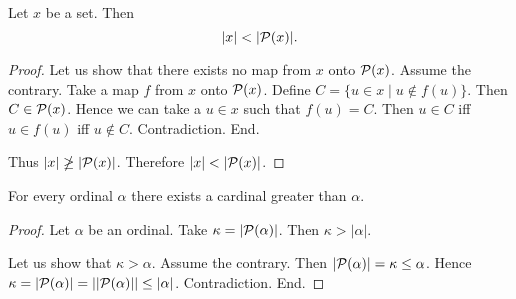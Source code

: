 \documentclass[../set-theory.tex]{subfiles}
\begin{document}
  \begin{forthel}
    \begin{theorem}[Cantor]
      Let $x$ be a set.
      Then \[ |x| < |\mathcal{P}(x)|. \]
    \end{theorem}
    \begin{proof}
      Let us show that there exists no map from $x$ onto $\mathcal{P}(x)$.
        Assume the contrary.
        Take a map $f$ from $x$ onto $\mathcal{P}(x)$.
        Define $C = \{ u \in x \mid u \notin f(u) \}$.
        Then $C \in \mathcal{P}(x)$.
        Hence we can take a $u \in x$ such that $f(u) = C$.
        Then $u \in C$ iff $u \in f(u)$ iff $u \notin C$.
        Contradiction.
      End.

      Thus $|x| \ngeq |\mathcal{P}(x)|$.
      Therefore $|x| < |\mathcal{P}(x)|$.
    \end{proof}
  \end{forthel}

  \begin{forthel}
    \begin{theorem}
      For every ordinal $\alpha$ there exists a cardinal greater than $\alpha$.
    \end{theorem}
    \begin{proof}
      Let $\alpha$ be an ordinal.
      Take $\kappa = |\mathcal{P}(\alpha)|$.
      Then $\kappa > |\alpha|$.

      Let us show that $\kappa > \alpha$.
        Assume the contrary.
        Then $|\mathcal{P}(\alpha)|
          = \kappa
          \leq \alpha$.
        Hence $\kappa
          = |\mathcal{P}(\alpha)|
          = ||\mathcal{P}(\alpha)||
          \leq |\alpha|$.
        Contradiction.
      End.
    \end{proof}
  \end{forthel}
\end{document}
